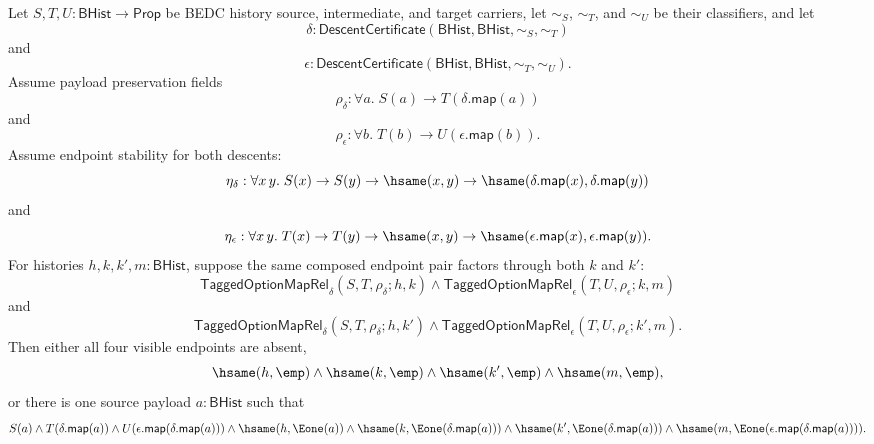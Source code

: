 \begin{theorem}
\label{thm:tagged-option-maprel-composite-factorization-canonical-intermediate}
Let $S,T,U:\mathsf{BHist}\to\mathsf{Prop}$ be BEDC history source,
intermediate, and target carriers, let $\sim_S$, $\sim_T$, and $\sim_U$ be their
classifiers, and let
$$
\delta:\mathsf{DescentCertificate}(\mathsf{BHist},\mathsf{BHist},\sim_S,\sim_T)
$$
and
$$
\epsilon:\mathsf{DescentCertificate}(\mathsf{BHist},\mathsf{BHist},\sim_T,\sim_U).
$$
Assume payload preservation fields
$$
\rho_{\delta}:\forall a.\;S(a)\to T(\delta.\mathsf{map}(a))
$$
and
$$
\rho_{\epsilon}:\forall b.\;T(b)\to U(\epsilon.\mathsf{map}(b)).
$$
Assume endpoint stability for both descents:
$$
\eta_{\delta}:\forall x\,y.\;
S(x)\to S(y)\to \hsame(x,y)\to
\hsame(\delta.\mathsf{map}(x),\delta.\mathsf{map}(y))
$$
and
$$
\eta_{\epsilon}:\forall x\,y.\;
T(x)\to T(y)\to \hsame(x,y)\to
\hsame(\epsilon.\mathsf{map}(x),\epsilon.\mathsf{map}(y)).
$$
For histories $h,k,k',m:\mathsf{BHist}$, suppose the same composed endpoint pair
factors through both $k$ and $k'$:
$$
\mathsf{TaggedOptionMapRel}_{\delta}(S,T,\rho_{\delta};h,k)
\land
\mathsf{TaggedOptionMapRel}_{\epsilon}(T,U,\rho_{\epsilon};k,m)
$$
and
$$
\mathsf{TaggedOptionMapRel}_{\delta}(S,T,\rho_{\delta};h,k')
\land
\mathsf{TaggedOptionMapRel}_{\epsilon}(T,U,\rho_{\epsilon};k',m).
$$
Then either all four visible endpoints are absent,
$$
\hsame(h,\emp)\land
\hsame(k,\emp)\land
\hsame(k',\emp)\land
\hsame(m,\emp),
$$
or there is one source payload $a:\mathsf{BHist}$ such that
$$
S(a)\land
T(\delta.\mathsf{map}(a))\land
U(\epsilon.\mathsf{map}(\delta.\mathsf{map}(a)))\land
\hsame(h,\Eone(a))\land
\hsame(k,\Eone(\delta.\mathsf{map}(a)))\land
\hsame(k',\Eone(\delta.\mathsf{map}(a)))\land
\hsame(m,\Eone(\epsilon.\mathsf{map}(\delta.\mathsf{map}(a)))).
$$
\end{theorem}
